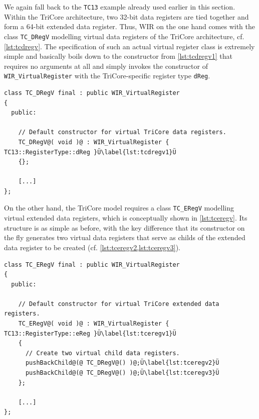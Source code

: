 We again fall back to the \texttt{TC13} example already used earlier in this section.
Within the TriCore architecture, two 32-bit data registers are tied together and form a 64-bit extended data register.
Thus, \gls{WIR} on the one hand comes with the class \texttt{TC\_DRegV} modelling virtual data registers of the TriCore architecture, cf. \cref{lst:tcdregv}.
The specification of such an actual virtual register class is extremely simple and basically boils down to the constructor from \cref{lst:tcdregv1} that requires no arguments at all and simply invokes the constructor of \texttt{WIR\_VirtualRegister} with the TriCore-specific register type \texttt{dReg}.

\begin{lstlisting}[style=code,float=ht,caption={Concrete Modelling of Virtual Data Registers (here for TriCore architecture)},label=lst:tcdregv]
class TC_DRegV final : public WIR_VirtualRegister
{
  public:

    // Default constructor for virtual TriCore data registers.
    TC_DRegV@( void )@ : WIR_VirtualRegister { TC13::RegisterType::dReg }Ü\label{lst:tcdregv1}Ü
    {};

    [...]
};
\end{lstlisting}

On the other hand, the TriCore model requires a class \texttt{TC\_ERegV} modelling virtual extended data registers, which is conceptually shown in \cref{lst:tceregv}.
Its structure is as simple as before, with the key difference that its constructor on the fly generates two virtual data registers that serve as childs of the extended data register to be created (cf. \cref{lst:tceregv2,lst:tceregv3}).

\begin{lstlisting}[style=code,float=t,caption={Concrete Modelling of Virtual Extended Data Registers (here for TriCore architecture)},label=lst:tceregv]
class TC_ERegV final : public WIR_VirtualRegister
{
  public:

    // Default constructor for virtual TriCore extended data registers.
    TC_ERegV@( void )@ : WIR_VirtualRegister { TC13::RegisterType::eReg }Ü\label{lst:tceregv1}Ü
    {
      // Create two virtual child data registers.
      pushBackChild@(@ TC_DRegV@() )@;Ü\label{lst:tceregv2}Ü
      pushBackChild@(@ TC_DRegV@() )@;Ü\label{lst:tceregv3}Ü
    };

    [...]
};
\end{lstlisting}

